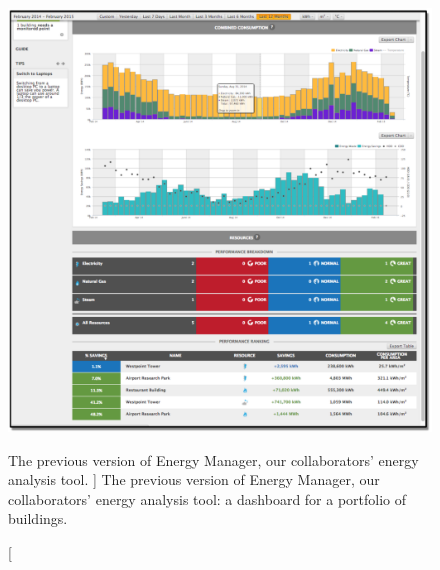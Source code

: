 \begin{figure}
	\centering
	\includegraphics[width=\textwidth]{figures/em-top.pdf}
	\caption
	[
	    The previous version of Energy Manager, our collaborators' energy analysis tool.
	]
	{
	    The previous version of Energy Manager, our collaborators' energy analysis tool: a dashboard for a portfolio of buildings.
	}
	\centering
	\label{emu:fig:energy-manager-top}
\end{figure} 



